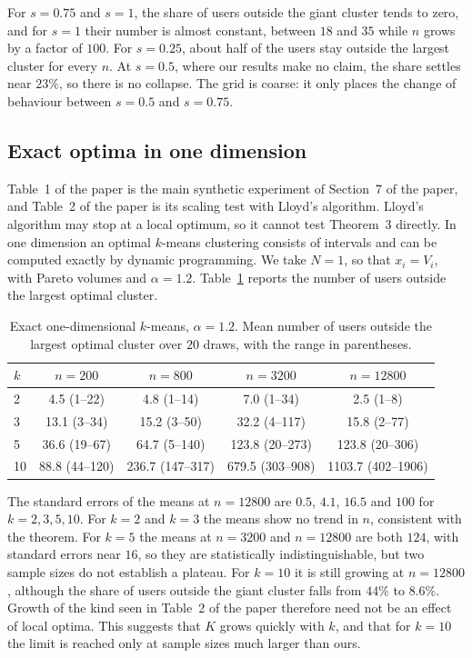 \documentclass[11pt]{article}
\theoremstyle{remark}\newtheorem{remark}{Remark}\renewcommand{\theremark}{S\arabic{remark}}
\begin{document}
For $s=0.75$ and $s=1$, the share of users outside the giant cluster tends to zero, and for $s=1$ their number is almost constant, between $18$ and $35$ while $n$ grows by a factor of $100$. For $s=0.25$, about half of the users stay outside the largest cluster for every $n$. At $s=0.5$, where our results make no claim, the share settles near $23\%$, so there is no collapse. The grid is coarse: it only places the change of behaviour between $s=0.5$ and $s=0.75$.

\subsection*{Exact optima in one dimension}
Table~1 of the paper is the main synthetic experiment of Section~7 of the paper, and Table~2 of the paper is its scaling test with Lloyd's algorithm. Lloyd's algorithm may stop at a local optimum, so it cannot test Theorem~3 directly. In one dimension an optimal $k$-means clustering consists of intervals and can be computed exactly by dynamic programming. We take $N=1$, so that $x_i=V_i$, with Pareto volumes and $\alpha=1.2$. Table~\ref{tab:exact} reports the number of users outside the largest optimal cluster.

\begin{table}[ht]
\centering
\caption{Exact one-dimensional $k$-means, $\alpha=1.2$. Mean number of users outside the largest optimal cluster over $20$ draws, with the range in parentheses.}\label{tab:exact}
\begin{tabular}{lcccc}
\toprule
$k$ & $n=200$ & $n=800$ & $n=3200$ & $n=12800$ \\
\midrule
2 & 4.5 (1--22) & 4.8 (1--14) & 7.0 (1--34) & 2.5 (1--8) \\
3 & 13.1 (3--34) & 15.2 (3--50) & 32.2 (4--117) & 15.8 (2--77) \\
5 & 36.6 (19--67) & 64.7 (5--140) & 123.8 (20--273) & 123.8 (20--306) \\
10 & 88.8 (44--120) & 236.7 (147--317) & 679.5 (303--908) & 1103.7 (402--1906) \\
\bottomrule
\end{tabular}
\end{table}

The standard errors of the means at $n=12800$ are $0.5$, $4.1$, $16.5$ and $100$ for $k=2,3,5,10$. For $k=2$ and $k=3$ the means show no trend in $n$, consistent with the theorem. For $k=5$ the means at $n=3200$ and $n=12800$ are both $124$, with standard errors near $16$, so they are statistically indistinguishable, but two sample sizes do not establish a plateau. For $k=10$ it is still growing at $n=12800$, although the share of users outside the giant cluster falls from $44\%$ to $8.6\%$. Growth of the kind seen in Table~2 of the paper therefore need not be an effect of local optima. This suggests that $K$ grows quickly with $k$, and that for $k=10$ the limit is reached only at sample sizes much larger than ours.
\end{document}
